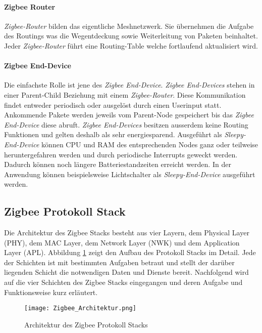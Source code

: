 \paragraph{Zigbee Router}
\textit{Zigbee-Router} bilden das eigentliche Meshnetzwerk. Sie übernehmen die Aufgabe des Routings was die Wegentdeckung sowie Weiterleitung von Paketen beinhaltet. Jeder \textit{Zigbee-Router} führt eine Routing-Table welche fortlaufend aktualisiert wird.

\paragraph{Zigbee End-Device}
Die einfachste Rolle ist jene des \textit{Zigbee End-Device}. \textit{Zigbee End-Devices} stehen in einer Parent-Child Beziehung mit einem \textit{Zigbee-Router}.
Diese Kommunikation findet entweder periodisch oder ausgelöst durch einen Userinput statt.
Ankommende Pakete werden jeweils vom Parent-Node gespeichert bis das \textit{Zigbee End-Device} diese abruft.
\textit{Zigbee End-Devices} besitzen ausserdem keine Routing Funktionen und gelten deshalb als sehr energiesparend.
Ausgeführt als \textit{Sleepy-End-Device} können CPU und RAM des entsprechenden Nodes ganz oder teilweise heruntergefahren werden und durch periodische Interrupts geweckt werden.
Dadurch können noch längere Batteriestandzeiten erreicht werden.
In der Anwendung können beispielsweise Lichtschalter als \textit{Sleepy-End-Device} ausgeführt werden. \cite{markus_krause_rainer_konrad_zigbee_2014}


\subsection{Zigbee Protokoll Stack}
Die Architektur des Zigbee Stacks besteht aus vier Layern, dem Physical Layer (PHY), dem MAC Layer, dem Network Layer (NWK) und dem Application Layer (APL).
Abbildung \ref{fig:ArchitekturdesZigbeeProtokollStacks} zeigt den Aufbau des Protokoll Stacks im Detail.
Jede der Schichten ist mit bestimmten Aufgaben betraut und stellt der darüber liegenden Schicht die notwendigen Daten und Dienste bereit.
Nachfolgend wird auf die vier Schichten des Zigbee Stacks eingegangen und deren Aufgabe und Funktionsweise kurz erläutert.

\begin{figure}[h]
	\centering
	\texttt{[image: Zigbee\_Architektur.png]}
	\caption{Architektur des Zigbee Protokoll Stacks}
	\label{fig:ArchitekturdesZigbeeProtokollStacks}
\end{figure}


